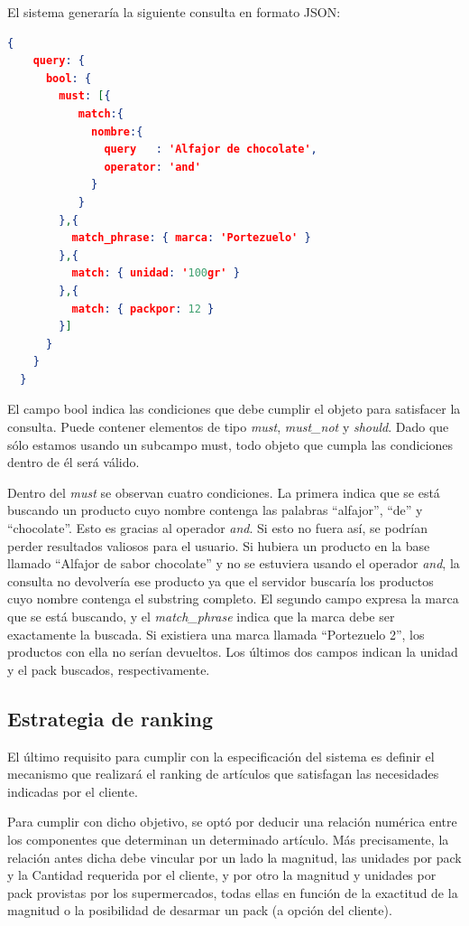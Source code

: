 \documentclass[12pt]{article} %
\begin{document}
El sistema generaría la siguiente consulta en formato JSON:
\begin{lstlisting}[language=json,firstnumber=1]
  {
    query: {
      bool: {
        must: [{ 
           match:{ 
             nombre:{ 
               query   : 'Alfajor de chocolate', 
               operator: 'and' 
             } 
           } 
        },{ 
          match_phrase: { marca: 'Portezuelo' } 
        },{ 
          match: { unidad: '100gr' } 
        },{ 
          match: { packpor: 12 } 
        }]
      }
    }
  }
\end{lstlisting}

El campo bool indica las condiciones que debe cumplir el objeto para satisfacer la consulta. Puede contener elementos de tipo \textit{must}, \textit{must\_not} y \textit{should}. Dado que sólo estamos usando un subcampo must, todo objeto que cumpla las condiciones dentro de él será válido.

Dentro del \textit{must} se observan cuatro condiciones. La primera indica que se está buscando un producto cuyo nombre contenga las palabras “alfajor”, “de” y “chocolate”. Esto es gracias al operador \textit{and}. Si esto no fuera así, se podrían perder resultados valiosos para el usuario. Si hubiera un producto en la base llamado “Alfajor de sabor chocolate” y no se estuviera usando el operador \textit{and}, la consulta no devolvería ese producto ya que el servidor buscaría los productos cuyo nombre contenga el substring completo. El segundo campo expresa la marca que se está buscando, y el \textit{match\_phrase} indica que la marca debe ser exactamente la buscada. Si existiera una marca llamada “Portezuelo 2”, los productos con ella no serían devueltos. Los últimos dos campos indican la unidad y el pack buscados, respectivamente.


\subsection{Estrategia de ranking}
El último requisito para cumplir con la especificación del sistema es definir el mecanismo que realizará el ranking de artículos que satisfagan las necesidades indicadas por el cliente. 

Para cumplir con dicho objetivo, se optó por deducir una relación numérica entre los componentes que determinan un determinado artículo. Más precisamente, la relación antes dicha debe vincular por un lado la magnitud, las unidades por pack y la Cantidad requerida por el cliente, y por otro la magnitud y unidades por pack provistas por los supermercados, todas ellas en función de la exactitud de la magnitud o la posibilidad de desarmar un pack (a opción del cliente). 
\end{document}
